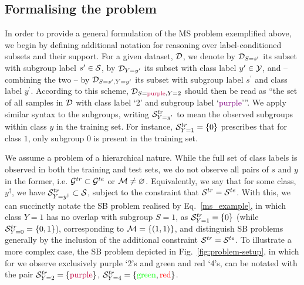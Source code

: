\subsection{Formalising the problem}\label{ssec:problem_formalism}
In order to provide a general formulation of the \ac{MS} problem exemplified above, we begin by
defining additional notation for reasoning over label-conditioned subsets and their support. 
%
For a given dataset, \( {\mathcal{D}} \), we denote by \( {\mathcal{D}}_{S=s^\prime} \) its subset with subgroup label
\( s^\prime \in {\mathcal{S}} \), by \( {\mathcal{D}}_{Y=y^\prime} \) its subset with class label \( y^\prime \in {\mathcal{Y}}
\), and -- combining the two -- by \( {\mathcal{D}}_{S=s^\prime,Y=y^\prime} \) its subset with subgroup label
\( s^\prime \) and class label \( y^\prime \).
%
According to this scheme, \( {\mathcal{D}}_{S=\text{\color{purple}{purple}}, Y=\text{2}} \) should then be
read as ``the set of all samples in \( {\mathcal{D}} \) with class label `2' and subgroup label
`\textcolor{purple}{purple}'''.
%
We apply similar syntax to the subgroups, writing \( {\mathcal{S}}^{tr}_{Y=y^\prime} \) to mean the observed
subgroups within class \(y\) in the training set.
%
For instance, \({\mathcal{S}}^{tr}_{Y=1}=\{0\}\) prescribes that for class \(1\), only subgroup \(0\) is
present in the training set.

We assume a problem of a hierarchical nature.
%
While the full set of class labels is observed in both the training and test sets, we do not
observe all pairs of \(s\) and \(y\) in the former, i.e. \( {\mathcal{G}}^{tr} \subset {\mathcal{G}}^{te} \) or \({\mathcal{M}}
\neq \varnothing \). 
%
Equivalently, we say that for some class, \(y^\dagger\), we have \( {\mathcal{S}}^{tr}_{Y=y^\dagger} \subset
{\mathcal{S}} \), subject to the constraint that \(  {\mathcal{S}}^{tr} = {\mathcal{S}}^{te} \).
%
With this, we can succinctly notate the SB problem realised by Eq.~\ref{ms_example}, in which class
\(Y=1\) has no overlap with subgroup \(S=1\), as \({\mathcal{S}}^{tr}_{Y=1}=\{0\}\) (while
\({\mathcal{S}}^{tr}_{Y=0}=\{ 0, 1 \}\)), corresponding to \( {\mathcal{M}} = \{(1, 1)\} \), and distinguish SB
problems generally by the inclusion of the additional constraint \( {\mathcal{S}}^{tr} = {\mathcal{S}}^{te} \).
%
To illustrate a more complex case, the SB problem depicted in Fig.~\ref{fig:problem-setup}, in
which for we observe exclusively purple `2's and green and red `4's, can be notated with the pair
\( {\mathcal{S}}^{tr}_{Y=2}=\{\text{\textcolor{purple}{purple}\}} \), \( {\mathcal{S}}^{tr}_{Y=4}=\{
\text{\textcolor{green}{green}}, \text{\textcolor{red}{red}} \} \).
